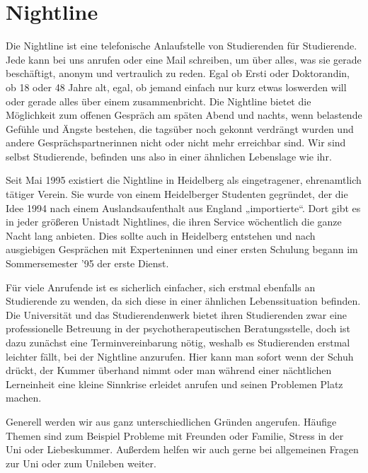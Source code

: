 \newpage
\section{Nightline}%
Die Nightline ist eine telefonische Anlaufstelle von Studierenden für Studierende. Jede kann bei uns anrufen oder eine Mail schreiben, um über alles, was sie gerade beschäftigt, anonym und vertraulich zu reden. Egal ob Ersti oder Doktorandin, ob 18 oder 48 Jahre alt, egal, ob jemand einfach nur kurz etwas loswerden will oder gerade alles über einem zusammenbricht. Die Nightline bietet die Möglichkeit zum offenen Gespräch am späten Abend und nachts, wenn belastende Gefühle und Ängste bestehen, die tagsüber noch gekonnt verdrängt wurden und andere Gesprächspartnerinnen nicht oder nicht mehr erreichbar sind. Wir sind selbst Studierende, befinden uns also in einer ähnlichen Lebenslage wie ihr.


Seit Mai 1995 existiert die Nightline in Heidelberg als eingetragener, ehrenamtlich tätiger Verein. Sie wurde von einem Heidelberger Studenten gegründet, der die Idee 1994 nach einem Auslandsaufenthalt aus England „importierte“. Dort gibt es in jeder größeren Unistadt Nightlines, die ihren Service wöchentlich die ganze Nacht lang anbieten. Dies sollte auch in Heidelberg entstehen und nach ausgiebigen Gesprächen mit Experteninnen und einer ersten Schulung begann im Sommersemester '95 der erste Dienst.

Für viele Anrufende ist es sicherlich einfacher, sich erstmal ebenfalls an Studierende zu wenden, da sich diese in einer ähnlichen Lebenssituation befinden. Die Universität und das Studierendenwerk bietet ihren Studierenden zwar eine professionelle Betreuung in der psychotherapeutischen Beratungsstelle, doch ist dazu zunächst eine Terminvereinbarung nötig, weshalb es Studierenden erstmal leichter fällt, bei der Nightline anzurufen. Hier kann man sofort wenn der Schuh drückt, der Kummer überhand nimmt oder man während einer nächtlichen Lerneinheit eine kleine Sinnkrise erleidet anrufen und seinen Problemen Platz machen.

Generell werden wir aus ganz unterschiedlichen Gründen angerufen. Häufige Themen sind zum Beispiel Probleme mit Freunden oder Familie, Stress in der Uni oder Liebeskummer. Außerdem helfen wir auch gerne bei allgemeinen Fragen zur Uni oder zum Unileben weiter.

